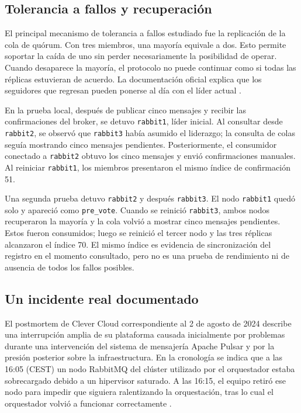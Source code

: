 \documentclass[12pt,a4paper]{article}
\begin{document}
\subsection{Tolerancia a fallos y recuperación}
El principal mecanismo de tolerancia a fallos estudiado fue la replicación de la cola de quórum. Con tres miembros, una mayoría equivale a dos. Esto permite soportar la caída de uno sin perder necesariamente la posibilidad de operar. Cuando desaparece la mayoría, el protocolo no puede continuar como si todas las réplicas estuvieran de acuerdo. La documentación oficial explica que los seguidores que regresan pueden ponerse al día con el líder actual \cite{RabbitMQQuorum2026}.

En la prueba local, después de publicar cinco mensajes y recibir las confirmaciones del broker, se detuvo \texttt{rabbit1}, líder inicial. Al consultar desde \texttt{rabbit2}, se observó que \texttt{rabbit3} había asumido el liderazgo; la consulta de colas seguía mostrando cinco mensajes pendientes. Posteriormente, el consumidor conectado a \texttt{rabbit2} obtuvo los cinco mensajes y envió confirmaciones manuales. Al reiniciar \texttt{rabbit1}, los miembros presentaron el mismo índice de confirmación 51.

Una segunda prueba detuvo \texttt{rabbit2} y después \texttt{rabbit3}. El nodo \texttt{rabbit1} quedó solo y apareció como \texttt{pre\_vote}. Cuando se reinició \texttt{rabbit3}, ambos nodos recuperaron la mayoría y la cola volvió a mostrar cinco mensajes pendientes. Estos fueron consumidos; luego se reinició el tercer nodo y las tres réplicas alcanzaron el índice 70. El mismo índice es evidencia de sincronización del registro en el momento consultado, pero no es una prueba de rendimiento ni de ausencia de todos los fallos posibles.

\subsection{Un incidente real documentado}
El postmortem de Clever Cloud correspondiente al 2 de agosto de 2024 describe una interrupción amplia de su plataforma causada inicialmente por problemas durante una intervención del sistema de mensajería Apache Pulsar y por la presión posterior sobre la infraestructura. En la cronología se indica que a las 16:05 (CEST) un nodo RabbitMQ del clúster utilizado por el orquestador estaba sobrecargado debido a un hipervisor saturado. A las 16:15, el equipo retiró ese nodo para impedir que siguiera ralentizando la orquestación, tras lo cual el orquestador volvió a funcionar correctamente \cite{CleverCloud2024}.
\end{document}
